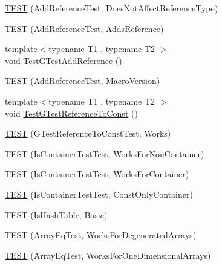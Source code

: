 \begin{DoxyCompactItemize}
\item 
\mbox{\hyperlink{googletest-master_2googletest_2test_2gtest__unittest_8cc_ac910b493f212cc393ec0a34310fd6072}{T\+E\+ST}} (Add\+Reference\+Test, Does\+Not\+Affect\+Reference\+Type)
\item 
\mbox{\hyperlink{googletest-master_2googletest_2test_2gtest__unittest_8cc_a79f243d73454356cbce420cb627f2a51}{T\+E\+ST}} (Add\+Reference\+Test, Adds\+Reference)
\item 
{\footnotesize template$<$typename T1 , typename T2 $>$ }\\void \mbox{\hyperlink{googletest-master_2googletest_2test_2gtest__unittest_8cc_a9c06f3b08ad59c7dff62b7680a307ed1}{Test\+G\+Test\+Add\+Reference}} ()
\item 
\mbox{\hyperlink{googletest-master_2googletest_2test_2gtest__unittest_8cc_a62b3c6edec9e43200fe9cce9a520f90e}{T\+E\+ST}} (Add\+Reference\+Test, Macro\+Version)
\item 
{\footnotesize template$<$typename T1 , typename T2 $>$ }\\void \mbox{\hyperlink{googletest-master_2googletest_2test_2gtest__unittest_8cc_a033ae0af50f62e72a31bf1a28151bd65}{Test\+G\+Test\+Reference\+To\+Const}} ()
\item 
\mbox{\hyperlink{googletest-master_2googletest_2test_2gtest__unittest_8cc_a69fa334ed4d6f74b62d2404b65ae7852}{T\+E\+ST}} (G\+Test\+Reference\+To\+Const\+Test, Works)
\item 
\mbox{\hyperlink{googletest-master_2googletest_2test_2gtest__unittest_8cc_a819ddb03c072631f5606a9ddf4be5ef9}{T\+E\+ST}} (Is\+Container\+Test\+Test, Works\+For\+Non\+Container)
\item 
\mbox{\hyperlink{googletest-master_2googletest_2test_2gtest__unittest_8cc_a28c741995150722b00c039ead2b8ab04}{T\+E\+ST}} (Is\+Container\+Test\+Test, Works\+For\+Container)
\item 
\mbox{\hyperlink{googletest-master_2googletest_2test_2gtest__unittest_8cc_a54cda93a5356bccbf0467950b644ff02}{T\+E\+ST}} (Is\+Container\+Test\+Test, Const\+Only\+Container)
\item 
\mbox{\hyperlink{googletest-master_2googletest_2test_2gtest__unittest_8cc_ab060da75dc9cd1d8ece17e4c1ed3c037}{T\+E\+ST}} (Is\+Hash\+Table, Basic)
\item 
\mbox{\hyperlink{googletest-master_2googletest_2test_2gtest__unittest_8cc_ae9e7a844847a2df933aa4c2f85f7ceed}{T\+E\+ST}} (Array\+Eq\+Test, Works\+For\+Degenerated\+Arrays)
\item 
\mbox{\hyperlink{googletest-master_2googletest_2test_2gtest__unittest_8cc_a4ea595c1e4b3620fb8cf7366dd533c95}{T\+E\+ST}} (Array\+Eq\+Test, Works\+For\+One\+Dimensional\+Arrays)

\end{DoxyCompactItemize}
